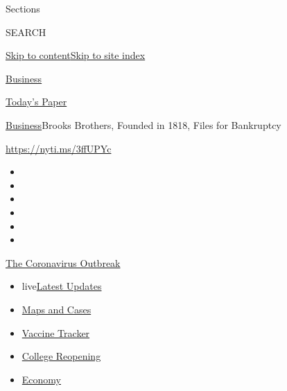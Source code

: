 Sections

SEARCH

\protect\hyperlink{site-content}{Skip to
content}\protect\hyperlink{site-index}{Skip to site index}

\href{https://www.nytimes3xbfgragh.onion/section/business}{Business}

\href{https://myaccount.nytimes3xbfgragh.onion/auth/login?response_type=cookie\&client_id=vi}{}

\href{https://www.nytimes3xbfgragh.onion/section/todayspaper}{Today's
Paper}

\href{/section/business}{Business}\textbar{}Brooks Brothers, Founded in
1818, Files for Bankruptcy

\href{https://nyti.ms/3ffUPYc}{https://nyti.ms/3ffUPYc}

\begin{itemize}
\item
\item
\item
\item
\item
\item
\end{itemize}

\href{https://www.nytimes3xbfgragh.onion/news-event/coronavirus?action=click\&pgtype=Article\&state=default\&region=TOP_BANNER\&context=storylines_menu}{The
Coronavirus Outbreak}

\begin{itemize}
\tightlist
\item
  live\href{https://www.nytimes3xbfgragh.onion/2020/08/03/world/coronavirus-covid-19.html?action=click\&pgtype=Article\&state=default\&region=TOP_BANNER\&context=storylines_menu}{Latest
  Updates}
\item
  \href{https://www.nytimes3xbfgragh.onion/interactive/2020/us/coronavirus-us-cases.html?action=click\&pgtype=Article\&state=default\&region=TOP_BANNER\&context=storylines_menu}{Maps
  and Cases}
\item
  \href{https://www.nytimes3xbfgragh.onion/interactive/2020/science/coronavirus-vaccine-tracker.html?action=click\&pgtype=Article\&state=default\&region=TOP_BANNER\&context=storylines_menu}{Vaccine
  Tracker}
\item
  \href{https://www.nytimes3xbfgragh.onion/2020/08/02/us/covid-college-reopening.html?action=click\&pgtype=Article\&state=default\&region=TOP_BANNER\&context=storylines_menu}{College
  Reopening}
\item
  \href{https://www.nytimes3xbfgragh.onion/live/2020/08/03/business/stock-market-today-coronavirus?action=click\&pgtype=Article\&state=default\&region=TOP_BANNER\&context=storylines_menu}{Economy}
\end{itemize}

